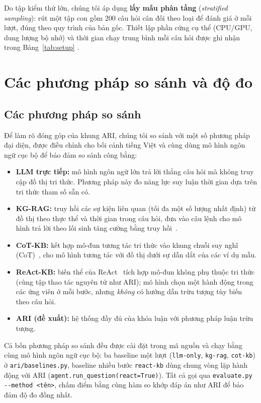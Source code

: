 Do tập kiểm thử lớn, chúng tôi áp dụng \textbf{lấy mẫu phân tầng} (\textit{stratified sampling}):
rút một tập con gồm 200 câu hỏi cân đối theo loại để đánh giá ở mỗi lượt, đúng theo quy trình của
bản gốc. Thiết lập phần cứng cụ thể (CPU/GPU, dung lượng bộ nhớ) và thời gian chạy trung bình mỗi
câu hỏi được ghi nhận trong Bảng~\ref{tab:setup} .

\section{Các phương pháp so sánh và độ đo}
\label{sec:baselines}

\subsection{Các phương pháp so sánh}

Để làm rõ đóng góp của khung ARI, chúng tôi so sánh với một số phương pháp đại diện, được điều chỉnh
cho bối cảnh tiếng Việt và cùng dùng mô hình ngôn ngữ cục bộ để bảo đảm so sánh công bằng:

\begin{itemize}
  \item \textbf{LLM trực tiếp:} mô hình ngôn ngữ lớn trả lời thẳng câu hỏi mà không truy cập đồ thị
  tri thức. Phương pháp này đo năng lực suy luận thời gian dựa trên tri thức tham số sẵn có.
  \item \textbf{KG-RAG:} truy hồi các sự kiện liên quan (tối đa một số lượng nhất định) từ đồ thị
  theo thực thể và thời gian trong câu hỏi, đưa vào câu lệnh cho mô hình trả lời theo lối sinh tăng
  cường bằng truy hồi~\cite{baek2023kaping}.
  \item \textbf{CoT-KB:} kết hợp mô-đun tương tác tri thức vào khung chuỗi suy nghĩ
  (CoT)~\cite{wei2022cot}, cho mô hình tương tác với đồ thị dưới sự dẫn dắt của các ví dụ mẫu.
  \item \textbf{ReAct-KB:} biến thể của ReAct~\cite{yao2023react} tích hợp mô-đun không phụ thuộc
  tri thức (cùng tập thao tác nguyên tử như ARI); mô hình chọn một hành động trong các ứng viên ở
  mỗi bước, nhưng \emph{không} có hướng dẫn trừu tượng tùy biến theo câu hỏi.
  \item \textbf{ARI (đề xuất):} hệ thống đầy đủ của khóa luận với phương pháp luận trừu tượng.
\end{itemize}

\noindent Cả bốn phương pháp so sánh đều được cài đặt trong mã nguồn và chạy bằng cùng mô hình ngôn
ngữ cục bộ: ba baseline một lượt (\texttt{llm-only}, \texttt{kg-rag}, \texttt{cot-kb}) ở
\texttt{ari/baselines.py}, baseline nhiều bước \texttt{react-kb} dùng chung vòng lặp hành động với
ARI (\texttt{agent.run\_question(react=True)}). Tất cả gọi qua \texttt{evaluate.py -{}-method <tên>},
chấm điểm bằng cùng hàm so khớp đáp án như ARI để bảo đảm độ đo đồng nhất.


